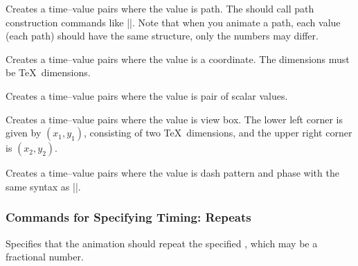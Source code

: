\begin{command}{\pgfsys@animation@val@path{}}
  Creates a time--value pairs where the value is path. The 
  should call path construction commands like |\pgfsys@lineto|. Note
  that when you animate a path, each value (each path) should have the
  same structure, only the numbers may differ.  
\end{command}

\begin{command}{\pgfsys@animation@val@translate{}}
  Creates a time--value pairs where the value is a coordinate. The
  dimensions must be \TeX\ dimensions.
\end{command}

\begin{command}{\pgfsys@animation@val@scale{}}
  Creates a time--value pairs where the value is pair of scalar values.
\end{command}

\begin{command}{\pgfsys@animation@val@viewbox{}}
  Creates a time--value pairs where the value is view box. The lower
  left corner is given by $(x_1,y_1)$, consisting of two \TeX\
  dimensions, and the upper right corner is $(x_2,y_2)$.
\end{command}


\begin{command}{\pgfsys@animation@val@dash{}}
  Creates a time--value pairs where the value is dash pattern and
  phase with the same syntax as |\pgfsys@setdash|.
\end{command}


\subsubsection{Commands for Specifying Timing: Repeats}


\begin{command}{\pgfsys@animation@repeat{}}
  Specifies that the animation should repeat the specified
  , which may be a fractional number.
\begin{codeexample}[width=2cm]
\end{codeexample}
\end{command}

